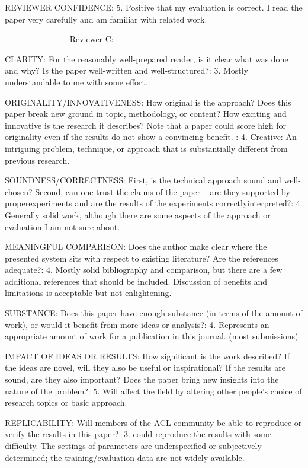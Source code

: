 \documentclass[10pt,a4paper]{letter}
\begin{document}
REVIEWER CONFIDENCE:
        5. Positive that my evaluation is correct. I read the paper very carefully
and am familiar with related work.


-----------------------
Reviewer C:
-----------------------


CLARITY: For the reasonably well-prepared reader, is it clear what was done
and why? Is the paper well-written and well-structured?:
        3. Mostly understandable to me with some effort.


ORIGINALITY/INNOVATIVENESS: How original is the approach? Does this paper
break new ground in topic, methodology, or content? How exciting and
innovative is the research it describes?
Note that a paper could score high for originality even if the results do
not show a convincing benefit.
:
        4. Creative: An intriguing problem, technique, or approach that is
substantially different from previous research.

SOUNDNESS/CORRECTNESS: First, is the technical approach sound and
well-chosen? Second, can one trust the claims of the paper -- are they
supported by properexperiments and are the results of the experiments
correctlyinterpreted?:
        4. Generally solid work, although there are some aspects of the approach or
evaluation I am not sure about.

MEANINGFUL COMPARISON: Does the author make clear where the presented system
sits with respect to existing literature? Are the references adequate?:
        4. Mostly solid bibliography and comparison, but there are a few additional
references that should be included. Discussion of benefits and limitations
is acceptable but not enlightening.

SUBSTANCE: Does this paper have enough substance (in terms of the amount of
work), or would it benefit from more ideas or analysis?:
        4. Represents an appropriate amount of work for a publication in this
journal. (most submissions)

IMPACT OF IDEAS OR RESULTS: How significant is the work described? If the
ideas are novel, will they also be useful or inspirational? If the results
are sound, are they also important? Does the paper bring new insights into
the nature of the problem?:
        5. Will affect the field by altering other people's choice of research
topics or basic approach.

REPLICABILITY: Will members of the ACL community be able to reproduce or
verify the results in this paper?:
        3. could reproduce the results with some difficulty. The settings of
parameters are underspecified or subjectively determined; the
training/evaluation data are not widely available.
\end{document}
